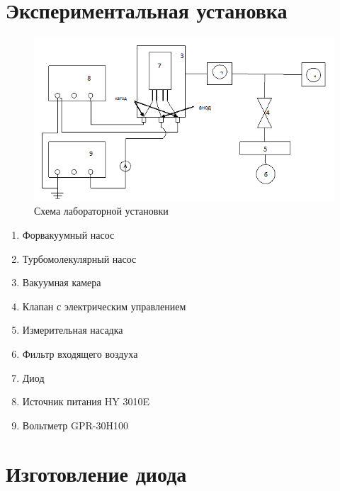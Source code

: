 \documentclass[11pt]{article}
\begin{document}
\section{Экспериментальная установка}
\begin{figure}[h]
    \centering
    \includegraphics[width=13cm]{setup.png}
    \caption{Схема лабораторной установки}
    \label{fig:vac}
\end{figure}
\begin{enumerate}
    \item Форвакуумный насос
\item Турбомолекулярный насос
\item Вакуумная камера
\item Клапан с электрическим управлением
\item Измерительная насадка
\item Фильтр входящего воздуха
\item Диод
\item Источник питания HY 3010E
\item Вольтметр GPR-30H100
\end{enumerate}

\section{Изготовление диода}
\end{document}
